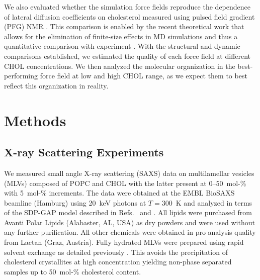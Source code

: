 \documentclass[journal=jctcce]{achemso}
\begin{document}
We also evaluated whether the simulation force fields reproduce the dependence of lateral diffusion coefficients on cholesterol measured using pulsed field gradient (PFG) NMR \cite{filippov2003effect,filippov2003influence}. This comparison is enabled by the recent theoretical work that allows for the elimination of finite-size effects in MD simulations and thus a quantitative comparison with experiment \cite{vogele2016divergent,vogele2018hydrodynamics}. With the structural and dynamic comparisons established, we estimated the quality of each force field at different CHOL concentrations. We then analyzed the molecular organization in the best-performing force field at low and high CHOL range, as we expect them to best reflect this organization in reality.

\section{Methods}

\subsection{X-ray Scattering Experiments}
 
We measured small angle X-ray scattering (SAXS) data on multilamellar vesicles (MLVs) composed of POPC and CHOL with the latter present at 0--50~mol-\% with 5~mol-\% increments. The data were obtained at the EMBL BioSAXS beamline (Hamburg) using 20~keV photons at $T=300$~K and analyzed in terms of the SDP-GAP model described in Refs.~ and . All lipids were purchased from Avanti Polar Lipids  (Alabaster, AL, USA) as dry powders and were used without any further purification. All other chemicals were obtained in pro analysis quality from Lactan (Graz, Austria). Fully hydrated MLVs were prepared using rapid solvent exchange as detailed  previously \cite{rieder2015optimizing,belivcka2017high}. This avoids the precipitation of cholesterol crystallites at high concentration \cite{buboltz1999novel} yielding non-phase separated samples up to 50~mol-\% cholesterol content.
\end{document}
